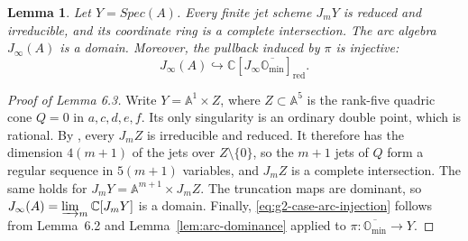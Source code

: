 \documentclass[11pt]{amsart}
\newtheorem{lemma}[theorem]{Lemma}
\theoremstyle{definition}
\theoremstyle{remark}
\newcommand{\C}{\mathbb C}
\newcommand{\red}{\mathrm{red}}
\begin{document}
\begin{lemma}\label{lem:g2-case-jets}
Let $Y=Spec(A)$. Every finite jet scheme $J_mY$ is reduced and irreducible, and its
coordinate ring is a complete intersection. The arc algebra $J_\infty(A)$
is a domain. Moreover, the pullback induced by $\pi$ is injective:
\begin{equation}\label{eq:g2-case-arc-injection}
 J_\infty(A)\hookrightarrow
 \C[J_\infty\overline{\mathbb O_{\min}}]_{\red}.
\end{equation}
\end{lemma}
\begin{proof}[Proof of Lemma 6.3]
Write $Y=\mathbb A^1\times Z$, where $Z\subset\mathbb A^5$ is the rank-five quadric cone $Q=0$ in
$a,c,d,e,f$. Its only singularity is an ordinary double point, which is rational. By
\cite[Theorem~0.1 and Proposition~1.5]{Mus}, every $J_mZ$ is irreducible and reduced. It
therefore has the dimension $4(m+1)$ of the jets over $Z\setminus\{0\}$, so the $m+1$ jets of $Q$
form a regular sequence in $5(m+1)$ variables, and $J_mZ$ is a complete intersection. The same
holds for $J_mY=\mathbb A^{m+1}\times J_mZ$. The truncation maps are dominant, so
$J_\infty(A)=\varinjlim_m\mathbb C[J_mY]$ is a domain. Finally, \eqref{eq:g2-case-arc-injection}
follows from Lemma~6.2 and Lemma~\ref{lem:arc-dominance} applied to
$\pi\colon\overline{\mathbb O_{\min}}\to Y$.
\end{proof}
\end{document}

